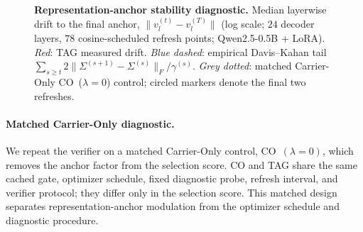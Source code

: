 \begin{figure}[t]
{%
}


\caption{\textbf{Representation-anchor stability diagnostic.}
\textnormal{Median layerwise drift to the final anchor,
$\|v_l^{(t)} - v_l^{(T)}\|$ (log scale; $24$ decoder layers,
$78$ cosine-scheduled refresh points; Qwen2.5-0.5B + LoRA).
\emph{Red}: \textsc{TAG} measured drift.
\emph{Blue dashed}: empirical Davis--Kahan tail
$\sum_{s\ge t} 2\|\Sigma^{(s+1)}-\Sigma^{(s)}\|_F/\gamma^{(s)}$.
\emph{Grey dotted}: matched
Carrier-Only CO~($\lambda{=}0$) control;
circled markers denote the final two refreshes.}}
\label{fig:anchor-drift}
\end{figure}

\paragraph{Matched Carrier-Only diagnostic.}
We repeat the verifier on a matched Carrier-Only control,
CO~\((\lambda{=}0)\), which removes the anchor factor from the
selection score. CO and \textsc{TAG} share the same cached gate,
optimizer schedule, fixed diagnostic probe, refresh interval, and verifier
protocol; they differ only in the selection score. This matched design separates
representation-anchor modulation from the optimizer schedule and
diagnostic procedure.

